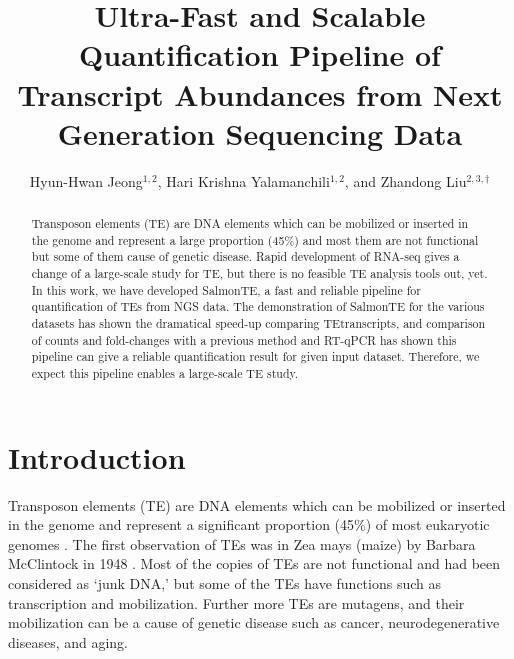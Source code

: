 \documentclass{ws-procs11x85}
\begin{document}
\title{Ultra-Fast and Scalable Quantification Pipeline of Transcript Abundances from Next Generation Sequencing Data}

\author{Hyun-Hwan Jeong$^{1,2}$, Hari Krishna Yalamanchili$^{1,2}$, and Zhandong Liu$^{2,3,\dag}$}

\address{$^{1}$Department of Molecular and Human Genetics, Baylor College of Medicine,\\
$^{2}$Jan and Dan Duncan Neurological Research Institute, Texas Children’s Hospital,\\
$^{3}$Department of Pediatrics, Baylor College of Medicine,\\
Houston, Texas 77030, USA\\
$^{\dag}$E-mail: zhandonl@bcm.edu}

\begin{abstract}
Transposon elements (TE) are DNA elements which can be mobilized or inserted in the genome and represent a large proportion (45\%) and most 
them are not functional but some of them cause of genetic disease. Rapid development of RNA-seq gives a change of a large-scale study for TE, but there is no feasible TE analysis tools out, yet. 
In this work, we have developed SalmonTE, a fast and reliable pipeline for quantification of TEs from 
NGS data.
The demonstration of SalmonTE for the various datasets has shown the dramatical speed-up comparing TEtranscripts, 
and comparison of counts and fold-changes with a previous method and RT-qPCR has shown this pipeline can give a reliable quantification result for given input dataset. Therefore, we expect this pipeline enables a large-scale TE study.
\end{abstract}



\bodymatter

\section{Introduction}\label{aba:intro}

Transposon elements (TE) are DNA elements which can be mobilized or inserted in the genome and represent a significant proportion (45\%) of most eukaryotic genomes \cite{erwin2014mobile}. The first observation of TEs was in Zea mays (maize) by Barbara McClintock in 1948 \cite{McClintock01011951}. Most of the copies of TEs are not functional and had been considered as `junk DNA,' but some of the TEs have functions such as transcription and mobilization.\cite{biemont2006genetics}
Further more TEs are mutagens, and their mobilization can be a cause of genetic disease \cite{belancio2008mammalian} such as cancer,
neurodegenerative diseases, and aging. %
\end{document}
